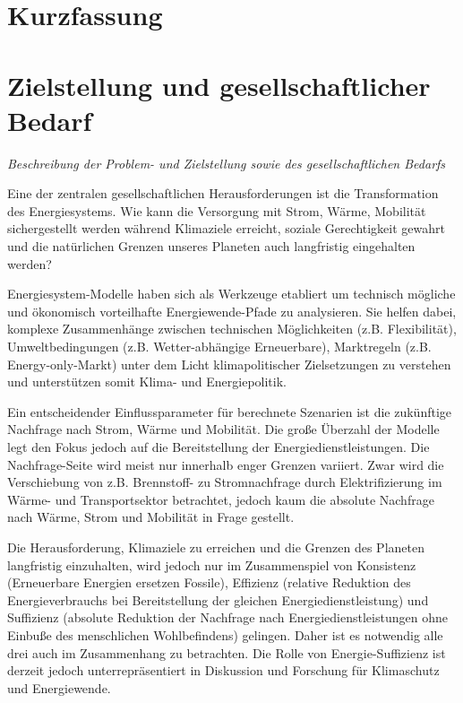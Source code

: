 \documentclass[a4paper,11pt,twoside]{scrartcl}
\begin{document}
\onehalfspacing

\clearpage


{\singlespacing

}

\setcounter{page}{1}


\section*{Kurzfassung}


\section{Zielstellung und gesellschaftlicher Bedarf}
\textit{Beschreibung der Problem- und Zielstellung sowie des gesellschaftlichen Bedarfs}

Eine der zentralen gesellschaftlichen Herausforderungen ist die Transformation des Energiesystems. Wie kann die Versorgung mit Strom, Wärme, Mobilität sichergestellt werden während Klimaziele erreicht, soziale Gerechtigkeit gewahrt und die natürlichen Grenzen unseres Planeten auch langfristig eingehalten werden?

Energiesystem-Modelle haben sich als Werkzeuge etabliert um technisch mögliche und ökonomisch vorteilhafte Energiewende-Pfade zu analysieren. Sie helfen dabei, komplexe Zusammenhänge zwischen technischen Möglichkeiten (z.B. Flexibilität), Umweltbedingungen (z.B. Wetter-abhängige Erneuerbare), Marktregeln (z.B. Energy-only-Markt) unter dem Licht klimapolitischer Zielsetzungen zu verstehen und unterstützen somit Klima- und Energiepolitik.

Ein entscheidender Einflussparameter für berechnete Szenarien ist die zukünftige Nachfrage nach Strom, Wärme und Mobilität. Die große Überzahl der Modelle legt den Fokus jedoch auf die Bereitstellung der Energiedienstleistungen. Die Nachfrage-Seite wird meist nur innerhalb enger Grenzen variiert. Zwar wird die Verschiebung von z.B. Brennstoff- zu Stromnachfrage durch Elektrifizierung im Wärme- und Transportsektor betrachtet, jedoch kaum die absolute Nachfrage nach Wärme, Strom und Mobilität in Frage gestellt.

Die Herausforderung, Klimaziele zu erreichen und die Grenzen des Planeten langfristig einzuhalten, wird jedoch nur im Zusammenspiel von Konsistenz (Erneuerbare Energien ersetzen Fossile), Effizienz (relative Reduktion des Energieverbrauchs bei Bereitstellung der gleichen Energiedienstleistung) und Suffizienz (absolute Reduktion der Nachfrage nach Energiedienstleistungen ohne Einbuße des menschlichen Wohlbefindens) gelingen. Daher ist es notwendig alle drei auch im Zusammenhang zu betrachten. Die Rolle von Energie-Suffizienz ist derzeit jedoch unterrepräsentiert in Diskussion und Forschung für Klimaschutz und Energiewende.
\end{document}
